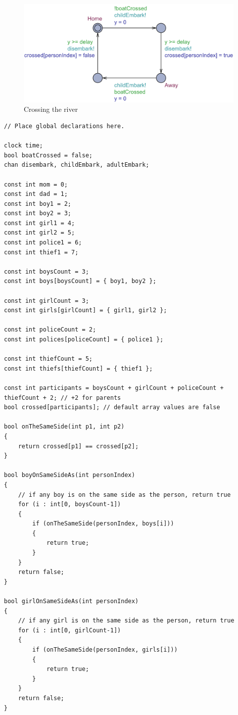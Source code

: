 \documentclass[a4paper,12pt]{article}
\begin{document}
\begin{figure}[H]
\centering
\includegraphics[width=\linewidth]{Child.pdf}
\caption{Crossing the river}
\end{figure}

\begin{lstlisting}[caption={Global declarations}]
// Place global declarations here.

clock time;
bool boatCrossed = false;
chan disembark, childEmbark, adultEmbark;

const int mom = 0;
const int dad = 1;
const int boy1 = 2;
const int boy2 = 3;
const int girl1 = 4;
const int girl2 = 5;
const int police1 = 6;
const int thief1 = 7;

const int boysCount = 3;
const int boys[boysCount] = { boy1, boy2 };

const int girlCount = 3;
const int girls[girlCount] = { girl1, girl2 };

const int policeCount = 2;
const int polices[policeCount] = { police1 };

const int thiefCount = 5;
const int thiefs[thiefCount] = { thief1 };

const int participants = boysCount + girlCount + policeCount + thiefCount + 2; // +2 for parents
bool crossed[participants]; // default array values are false

bool onTheSameSide(int p1, int p2)
{
    return crossed[p1] == crossed[p2];
}

bool boyOnSameSideAs(int personIndex)
{
    // if any boy is on the same side as the person, return true
    for (i : int[0, boysCount-1])
    {
        if (onTheSameSide(personIndex, boys[i]))
        {
            return true;
        }
    }
    return false;
}

bool girlOnSameSideAs(int personIndex)
{
    // if any girl is on the same side as the person, return true
    for (i : int[0, girlCount-1])
    {
        if (onTheSameSide(personIndex, girls[i]))
        {
            return true;
        }
    }
    return false;
}


\end{lstlisting}
\end{document}
